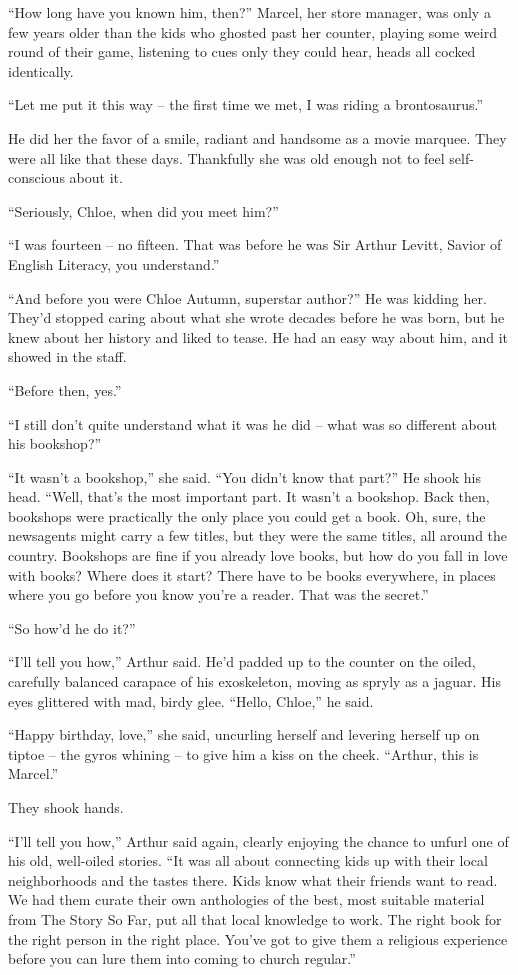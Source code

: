 “How long have you known him, then?” Marcel, her store manager, was 
only a few years older than the kids who ghosted past her counter, 
playing some weird round of their game, listening to cues only they 
could hear, heads all cocked identically.

“Let me put it this way -- the first time we met, I was riding a 
brontosaurus.”

He did her the favor of a smile, radiant and handsome as a movie 
marquee. They were all like that these days. Thankfully she was old 
enough not to feel self-conscious about it.

“Seriously, Chloe, when did you meet him?”

“I was fourteen -- no fifteen. That was before he was Sir Arthur 
Levitt, Savior of English Literacy, you understand.”

“And before you were Chloe Autumn, superstar author?” He was 
kidding her. They'd stopped caring about what she wrote decades before 
he was born, but he knew about her history and liked to tease. He had 
an easy way about him, and it showed in the staff.

“Before then, yes.”

“I still don't quite understand what it was he did -- what was so 
different about his bookshop?”

“It wasn't a bookshop,” she said. “You didn't know that part?” 
He shook his head. “Well, that's the most important part. It wasn't a 
bookshop. Back then, bookshops were practically the only place you 
could get a book. Oh, sure, the newsagents might carry a few titles, 
but they were the same titles, all around the country. Bookshops are 
fine if you already love books, but how do you fall in love with books? 
Where does it start? There have to be books everywhere, in places where 
you go before you know you're a reader. That was the secret.”

“So how'd he do it?”

“I'll tell you how,” Arthur said. He'd padded up to the counter on 
the oiled, carefully balanced carapace of his exoskeleton, moving as 
spryly as a jaguar. His eyes glittered with mad, birdy glee. “Hello, 
Chloe,” he said.

“Happy birthday, love,” she said, uncurling herself and levering 
herself up on tiptoe -- the gyros whining -- to give him a kiss on the 
cheek. “Arthur, this is Marcel.”

They shook hands.

“I'll tell you how,” Arthur said again, clearly enjoying the chance 
to unfurl one of his old, well-oiled stories. “It was all about 
connecting kids up with their local neighborhoods and the tastes there. 
Kids know what their friends want to read. We had them curate their own 
anthologies of the best, most suitable material from The Story So Far, 
put all that local knowledge to work. The right book for the right 
person in the right place. You've got to give them a religious 
experience before you can lure them into coming to church regular.”

